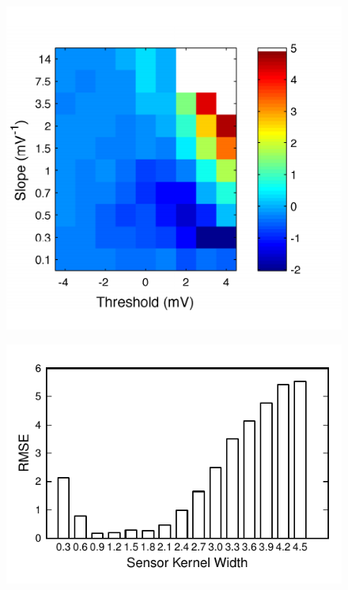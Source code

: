 \documentclass[review,authoryear,3p]{elsarticle}
\begin{document}
\clearpage
\newpage
\begin{figure}[!ht]
\begin{center}
\includegraphics{./Graph/pdf/fig11.pdf}
\end{center}
\caption{}
\label{fig:Figure11}
\end{figure}
\clearpage
\newpage
\begin{figure}[!ht]
\begin{center}
\includegraphics{./Graph/pdf/fig12.pdf}
\end{center}
\caption{}
\label{fig:Figure12}
\end{figure}
\end{document}
